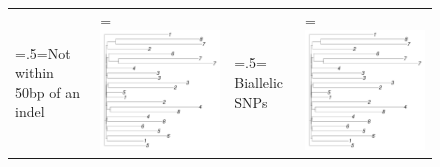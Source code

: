 \documentclass{article}
\begin{document}
\begin{figure}
\begin{tabularx}{\textwidth}{ >{\hsize=.5\hsize\linewidth=\hsize}X >{\hsize=1.5\hsize\linewidth=\hsize}X | >{\hsize=.5\hsize\linewidth=\hsize}X >{\hsize=1.5\hsize\linewidth=\hsize}X }
Not within 50bp of an indel & \includegraphics[width=\linewidth]{04-near-indel.pdf} &
Biallelic SNPs & \includegraphics[width=\linewidth]{05-biallelic.pdf}\\

\end{tabularx}
\end{figure}
\end{document}
